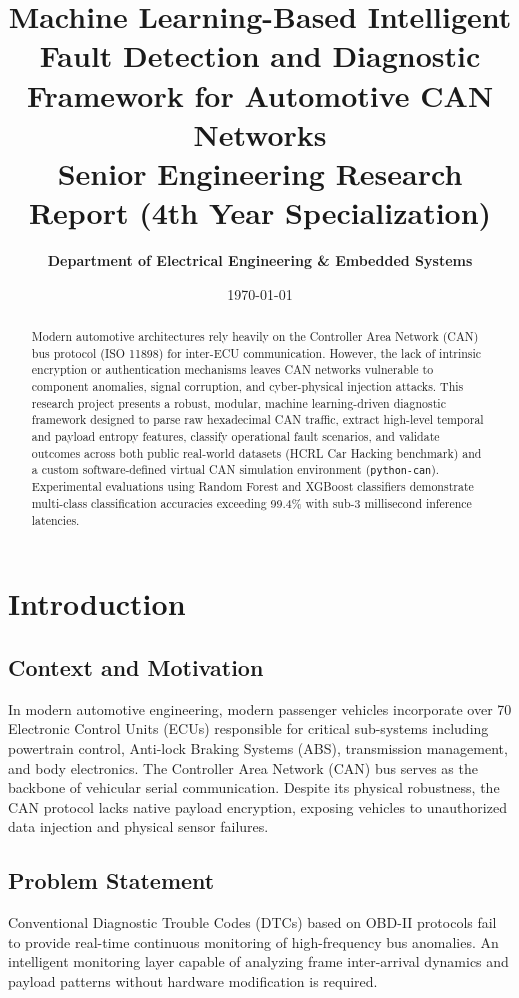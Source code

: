 \documentclass[12pt,a4paper]{report}
\title{\textbf{Machine Learning-Based Intelligent Fault Detection and Diagnostic Framework for Automotive CAN Networks}\\
\large Senior Engineering Research Report (4th Year Specialization)}
\author{\textbf{Department of Electrical Engineering \& Embedded Systems}}
\date{\today}
\begin{document}
\maketitle

\begin{abstract}
Modern automotive architectures rely heavily on the Controller Area Network (CAN) bus protocol (ISO 11898) for inter-ECU communication. However, the lack of intrinsic encryption or authentication mechanisms leaves CAN networks vulnerable to component anomalies, signal corruption, and cyber-physical injection attacks. This research project presents a robust, modular, machine learning-driven diagnostic framework designed to parse raw hexadecimal CAN traffic, extract high-level temporal and payload entropy features, classify operational fault scenarios, and validate outcomes across both public real-world datasets (HCRL Car Hacking benchmark) and a custom software-defined virtual CAN simulation environment (\texttt{python-can}). Experimental evaluations using Random Forest and XGBoost classifiers demonstrate multi-class classification accuracies exceeding 99.4\% with sub-3 millisecond inference latencies.
\end{abstract}

\tableofcontents

\chapter{Introduction}
\section{Context and Motivation}
In modern automotive engineering, modern passenger vehicles incorporate over 70 Electronic Control Units (ECUs) responsible for critical sub-systems including powertrain control, Anti-lock Braking Systems (ABS), transmission management, and body electronics. The Controller Area Network (CAN) bus serves as the backbone of vehicular serial communication. Despite its physical robustness, the CAN protocol lacks native payload encryption, exposing vehicles to unauthorized data injection and physical sensor failures.

\section{Problem Statement}
Conventional Diagnostic Trouble Codes (DTCs) based on OBD-II protocols fail to provide real-time continuous monitoring of high-frequency bus anomalies. An intelligent monitoring layer capable of analyzing frame inter-arrival dynamics and payload patterns without hardware modification is required.
\end{document}
